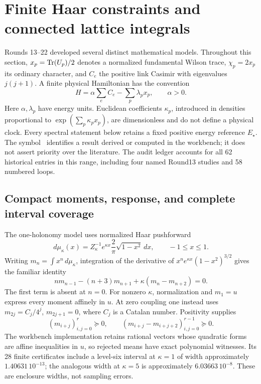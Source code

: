 \section{Finite Haar constraints and connected lattice integrals}
\label{sec:middle-static}

Rounds 13--22 developed several distinct mathematical models. Throughout this
section, \(x_p=\operatorname{Tr}(U_p)/2\) denotes a normalized fundamental Wilson trace,
\(\chi_p=2x_p\) its ordinary character, and \(C_e\) the positive link Casimir
with eigenvalues \(j(j+1)\). A finite physical Hamiltonian has the convention
\[
 H=\alpha\sum_e C_e-\sum_p\lambda_p x_p,\qquad \alpha>0.
\]
Here \(\alpha,\lambda_p\) have energy units. Euclidean coefficients
\(\kappa_p\), introduced in densities proportional to
\(\exp(\sum_p\kappa_p x_p)\), are dimensionless and do not define a physical
clock. Every spectral statement below retains a fixed positive energy
reference \(E_\star\). The symbol \workstar\ identifies a result derived or
computed in the workbench; it does not assert priority over the literature.
The audit ledger accounts for all 62 historical entries in this range,
including four named Round13 studies and 58 numbered loops.

\subsection{Compact moments, response, and complete interval coverage \workstar}
\label{sec:middle-moments}

The one-holonomy model uses normalized Haar pushforward
\[
 d\mu_\kappa(x)=Z_\kappa^{-1}e^{\kappa x}
       \frac2\pi\sqrt{1-x^2}\,dx,\qquad -1\le x\le1.
\]
Writing \(m_n=\int x^n\,d\mu_\kappa\), integration of the derivative of
\(x^ne^{\kappa x}(1-x^2)^{3/2}\) gives the familiar identity
\begin{equation}
 nm_{n-1}-(n+3)m_{n+1}+\kappa(m_n-m_{n+2})=0.
 \label{eq:middle-moments}
\end{equation}
The first term is absent at \(n=0\). For nonzero \(\kappa\), normalization
and \(m_1=u\) express every moment affinely in \(u\). At zero coupling one
instead uses \(m_{2j}=C_j/4^j\), \(m_{2j+1}=0\), where \(C_j\) is a Catalan
number. Positivity supplies
\[
 (m_{i+j})_{i,j=0}^{r}\succeq0,\qquad
 (m_{i+j}-m_{i+j+2})_{i,j=0}^{r-1}\succeq0.
\]
The workbench implementation retains rational vectors whose quadratic forms
are affine inequalities in \(u\), so rejected means have exact polynomial
witnesses. Its 28 finite certificates include a level-six interval at
\(\kappa=1\) of width approximately \(1.40631\,10^{-13}\); the analogous
width at \(\kappa=5\) is approximately \(6.03663\,10^{-8}\).
These are enclosure widths, not sampling errors.

